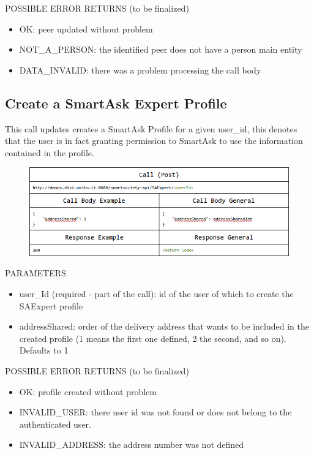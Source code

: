 POSSIBLE ERROR RETURNS (to be finalized)
\begin{itemize}
	\item OK: peer updated without problem
	\item NOT\_A\_PERSON: the identified peer does not have a person main entity
	\item DATA\_INVALID: there was a problem processing the call body
\end{itemize}

\subsection{Create a SmartAsk Expert Profile}
This call updates creates a SmartAsk Profile for a given user\_id, this denotes that the user is in fact granting permission to SmartAsk to use the information contained in the profile.

\begin{figure}[htb!]
\centering
\includegraphics[width=1\linewidth]{figures/abs-new-profile.png}
\label{fig:abs-new-profile}
\end{figure}

PARAMETERS
\begin{itemize}
	\item user\_Id (required - part of the call): id of the user of which to create the SAExpert profile
	\item addressShared: order of the delivery address that wants to be included in the created profile (1 means the first one defined, 2 the second, and so on). Defaults to 1
\end{itemize}

POSSIBLE ERROR RETURNS (to be finalized)
\begin{itemize}
	\item OK: profile created without problem
	\item INVALID\_USER: there user id was not found or does not belong to the authenticated user.
	\item INVALID\_ADDRESS: the address number was not defined
\end{itemize}